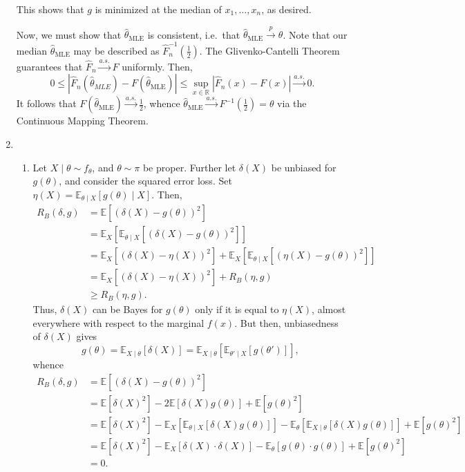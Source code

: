 \documentclass[11pt]{article}
\newcommand{\R}{\mathbb{R}}
\newcommand{\EE}{\mathbb{E}}
\newcommand{\MLE}{\text{MLE}}
\newcommand{\topp}{\overset{p}{\to}}
\newcommand{\toas}{\overset{a.s.}{\longrightarrow}}
\begin{document}
\begin{enumerate}
        This shows that $g$ is minimized at the median of $x_1, \dots, x_n$, as
        desired.

        Now, we must show that $\hat{\theta}_\MLE$ is consistent, i.e.\ that
        $\hat{\theta}_\MLE \topp \theta$.
        Note that our median $\hat{\theta}_\MLE$ may be described as
        $\hat{F}_n^{-1}(\frac{1}{2})$.
        The Glivenko-Cantelli Theorem guarantees that $\hat{F}_n \toas F$
        uniformly.
        Then, \[
            0 \leq |\hat{F}_n(\hat{\theta}_{MLE}) - F(\hat{\theta}_\MLE)|
                \leq \sup_{x \in \R} |\hat{F}_n(x) - F(x)|
                \toas 0.
        \] It follows that $F(\hat{\theta}_\MLE) \toas \frac{1}{2}$, whence
        $\hat{\theta}_\MLE \toas F^{-1}(\frac{1}{2}) = \theta$ via the
        Continuous Mapping Theorem.


        \item
        \begin{enumerate}
            \item Let $X\mid\theta \sim f_\theta$, and $\theta \sim \pi$ be
            proper.
            Further let $\delta(X)$ be unbiased for $g(\theta)$, and consider
            the squared error loss.
            Set $\eta(X) = \EE_{\theta\mid X}[g(\theta) \mid X]$.
            Then, \begin{align*}
                R_B(\delta, g)
                    &= \EE\left[(\delta(X) - g(\theta))^2\right] \\
                    &= \EE_X\left[\EE_{\theta\mid X}\left[(\delta(X) - g(\theta))^2\right]\right] \\
                    &= \EE_X\left[(\delta(X) - \eta(X))^2\right] + \EE_X\left[\EE_{\theta\mid X}\left[(\eta(X) - g(\theta))^2\right]\right] \\
                    &= \EE_X\left[(\delta(X) - \eta(X))^2\right] + R_B(\eta, g) \\
                    &\geq R_B(\eta, g).
            \end{align*}
            Thus, $\delta(X)$ can be Bayes for $g(\theta)$ only if it is equal
            to $\eta(X)$, almost everywhere with respect to the marginal
            $f(x)$.
            But then, unbiasedness of $\delta(X)$ gives \[
                g(\theta)
                    = \EE_{X\mid\theta}[\delta(X)]
                    = \EE_{X\mid\theta}[\EE_{\theta'\mid X}[g(\theta')]],
            \] whence \begin{align*}
                R_B(\delta, g)
                    &= \EE\left[(\delta(X) - g(\theta))^2\right] \\
                    &= \EE[\delta(X)^2] - 2 \EE[\delta(X)g(\theta)] + \EE[g(\theta)^2] \\
                    &= \EE[\delta(X)^2] - \EE_X[\EE_{\theta\mid X}[\delta(X)g(\theta)]] - \EE_\theta[\EE_{X\mid\theta}[\delta(X)g(\theta)]] + \EE[g(\theta)^2] \\
                    &= \EE[\delta(X)^2] - \EE_X[\delta(X)\cdot \delta(X)] - \EE_\theta[g(\theta)\cdot g(\theta)] + \EE[g(\theta)^2] \\
                    &= 0.
            \end{align*}



\end{enumerate}
\end{enumerate}
\end{document}
